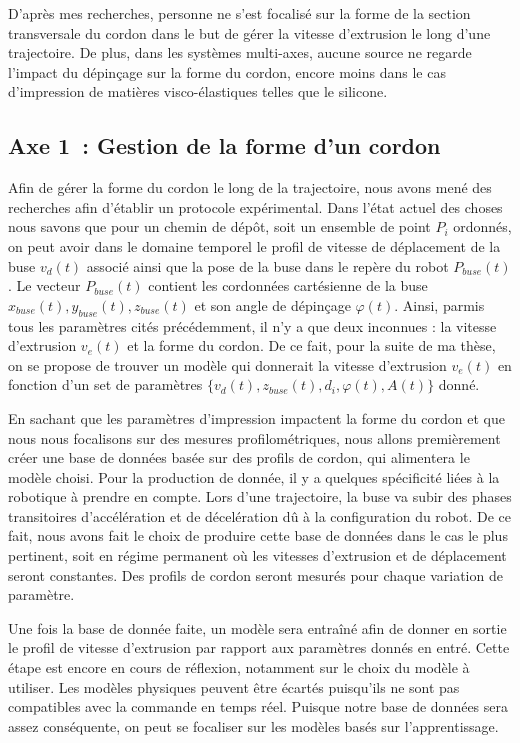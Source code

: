 \documentclass[11pt,a4paper]{article}
\begin{document}
        D'après mes recherches, personne ne s'est focalisé sur la forme de la section transversale du cordon dans le but de gérer la vitesse d'extrusion le long d'une trajectoire. De plus, dans les systèmes multi-axes, aucune source ne regarde l'impact du dépinçage sur la forme du cordon, encore moins dans le cas d'impression de matières visco-élastiques telles que le silicone.


    \subsection*{Axe 1~: Gestion de la forme d'un cordon}
        Afin de gérer la forme du cordon le long de la trajectoire, nous avons mené des recherches afin d'établir un protocole expérimental. Dans l'état actuel des choses nous savons que pour un chemin de dépôt, soit un ensemble de point $P_i$ ordonnés, on peut avoir dans le domaine temporel le profil de vitesse de déplacement de la buse $v_d(t)$ associé ainsi que la pose de la buse dans le repère du robot $P_{buse}(t)$. Le vecteur $P_{buse}(t)$ contient les cordonnées cartésienne de la buse $x_{buse}(t), y_{buse}(t), z_{buse}(t)$ et son angle de dépinçage $\varphi(t)$. Ainsi, parmis tous les paramètres cités précédemment, il n'y a que deux inconnues : la vitesse d'extrusion $v_e(t)$ et la forme du cordon. 
        De ce fait, pour la suite de ma thèse, on se propose de trouver un modèle qui donnerait la vitesse d'extrusion $v_e(t)$ en fonction d'un set de paramètres $\{v_d(t), z_{buse}(t), d_i, \varphi(t), A(t)\}$ donné. 

        En sachant que les paramètres d'impression impactent la forme du cordon et que nous nous focalisons sur des mesures profilométriques, nous allons premièrement créer une base de données basée sur des profils de cordon, qui alimentera le modèle choisi. 
        Pour la production de donnée, il y a quelques spécificité liées à la robotique à prendre en compte. Lors d'une trajectoire, la buse va subir des phases transitoires d'accélération et de décelération dû à la configuration du robot. De ce fait, nous avons fait le choix de produire cette base de données dans le cas le plus pertinent, soit en régime permanent où les vitesses d'extrusion et de déplacement seront constantes. Des profils de cordon seront mesurés pour chaque variation de paramètre. 

        Une fois la base de donnée faite, un modèle sera entraîné afin de donner en sortie le profil de vitesse d'extrusion par rapport aux paramètres donnés en entré. Cette étape est encore en cours de réflexion, notamment sur le choix du modèle à utiliser. Les modèles physiques peuvent être écartés puisqu'ils ne sont pas compatibles avec la commande en temps réel. Puisque notre base de données sera assez conséquente, on peut se focaliser sur les modèles basés sur l'apprentissage. 
\end{document}

